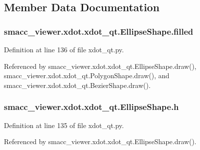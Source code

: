\subsection{Member Data Documentation}
\subsubsection[{\texorpdfstring{filled}{filled}}]{\setlength{\rightskip}{0pt plus 5cm}smacc\+\_\+viewer.\+xdot.\+xdot\+\_\+qt.\+Ellipse\+Shape.\+filled}\hypertarget{classsmacc__viewer_1_1xdot_1_1xdot__qt_1_1EllipseShape_adb6b248e82c0cc5e2bf9338e7faa6196}{}\label{classsmacc__viewer_1_1xdot_1_1xdot__qt_1_1EllipseShape_adb6b248e82c0cc5e2bf9338e7faa6196}


Definition at line 136 of file xdot\+\_\+qt.\+py.



Referenced by smacc\+\_\+viewer.\+xdot.\+xdot\+\_\+qt.\+Ellipse\+Shape.\+draw(), smacc\+\_\+viewer.\+xdot.\+xdot\+\_\+qt.\+Polygon\+Shape.\+draw(), and smacc\+\_\+viewer.\+xdot.\+xdot\+\_\+qt.\+Bezier\+Shape.\+draw().

\subsubsection[{\texorpdfstring{h}{h}}]{\setlength{\rightskip}{0pt plus 5cm}smacc\+\_\+viewer.\+xdot.\+xdot\+\_\+qt.\+Ellipse\+Shape.\+h}\hypertarget{classsmacc__viewer_1_1xdot_1_1xdot__qt_1_1EllipseShape_af9e9fe2972e06665badea52e53685968}{}\label{classsmacc__viewer_1_1xdot_1_1xdot__qt_1_1EllipseShape_af9e9fe2972e06665badea52e53685968}


Definition at line 135 of file xdot\+\_\+qt.\+py.



Referenced by smacc\+\_\+viewer.\+xdot.\+xdot\+\_\+qt.\+Ellipse\+Shape.\+draw().


